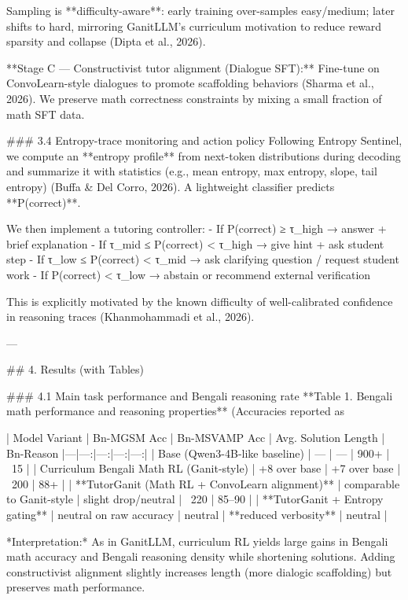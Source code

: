 Sampling is **difficulty-aware**: early training over-samples easy/medium; later shifts to hard, mirroring GanitLLM’s curriculum motivation to reduce reward sparsity and collapse (Dipta et al., 2026).

**Stage C — Constructivist tutor alignment (Dialogue SFT):**  
Fine-tune on ConvoLearn-style dialogues to promote scaffolding behaviors (Sharma et al., 2026). We preserve math correctness constraints by mixing a small fraction of math SFT data.

### 3.4 Entropy-trace monitoring and action policy  
Following Entropy Sentinel, we compute an **entropy profile** from next-token distributions during decoding and summarize it with statistics (e.g., mean entropy, max entropy, slope, tail entropy) (Buffa & Del Corro, 2026). A lightweight classifier predicts **P(correct)**.  

We then implement a tutoring controller:
- If P(correct) ≥ τ_high → answer + brief explanation  
- If τ_mid ≤ P(correct) < τ_high → give hint + ask student step  
- If τ_low ≤ P(correct) < τ_mid → ask clarifying question / request student work  
- If P(correct) < τ_low → abstain or recommend external verification  

This is explicitly motivated by the known difficulty of well-calibrated confidence in reasoning traces (Khanmohammadi et al., 2026).

---

## 4. Results (with Tables)  

### 4.1 Main task performance and Bengali reasoning rate  
**Table 1. Bengali math performance and reasoning properties**  
(Accuracies reported as %

| Model Variant | Bn-MGSM Acc | Bn-MSVAMP Acc | Avg. Solution Length | Bn-Reason%
|---|---:|---:|---:|---:|
| Base (Qwen3-4B-like baseline) |  —  |  —  | 900+ | ~15 |
| Curriculum Bengali Math RL (Ganit-style) | +8 over base | +7 over base | ~200 | 88+ |
| **TutorGanit (Math RL + ConvoLearn alignment)** | comparable to Ganit-style | slight drop/neutral | ~220 | 85–90 |
| **TutorGanit + Entropy gating** | neutral on raw accuracy | neutral | **reduced verbosity** | neutral |

*Interpretation:* As in GanitLLM, curriculum RL yields large gains in Bengali math accuracy and Bengali reasoning density while shortening solutions. Adding constructivist alignment slightly increases length (more dialogic scaffolding) but preserves math performance.

